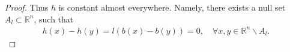\documentclass[oneside,english,a4wide]{amsart}
\numberwithin{equation}{section}
\numberwithin{figure}{section}
\theoremstyle{plain}
\theoremstyle{plain}
\theoremstyle{definition}
\theoremstyle{plain}
\theoremstyle{remark}
\theoremstyle{definition}
\theoremstyle{remark}
\theoremstyle{definition}
\newcommand{\8}{\infty}
\begin{document}
\begin{proof}
Thus $h$ is constant almost everywhere. Namely, there exists a null set $A_l\subset \mathbb{R}^n$, such that
	\begin{equation*}
		\begin{aligned}
			h(x)-h(y)=l(b(x)-b(y))=0,\quad  \forall x,y\in  \mathbb{R}^n\backslash A_l.
		\end{aligned}
	\end{equation*}

\end{proof}
\end{document}
